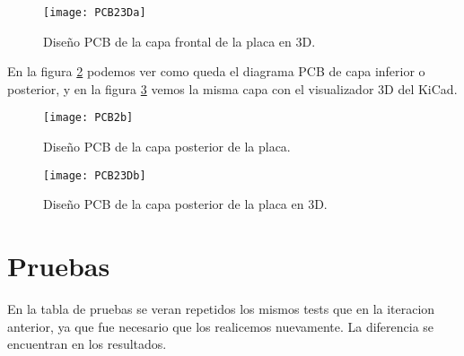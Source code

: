 \begin{figure}	
\centering
  \texttt{[image: PCB23Da]}
  \caption{Diseño PCB de la capa frontal de la placa en 3D.}\label{fig:PCB23Da}
\end{figure}

En la figura \ref{fig:PCB2b} podemos ver como queda el diagrama PCB de capa inferior o posterior, y en la figura \ref{fig:PCB23Db} vemos la misma capa con el visualizador 3D del KiCad.

\begin{figure}	
\centering
  \texttt{[image: PCB2b]}
  \caption{Diseño PCB de la capa posterior de la placa.}\label{fig:PCB2b}
\end{figure}

\begin{figure}	
\centering
  \texttt{[image: PCB23Db]}
  \caption{Diseño PCB de la capa posterior de la placa en 3D.}\label{fig:PCB23Db}
\end{figure}



\section{Pruebas} %
\label{sec:pruebas}

En la tabla de pruebas se veran repetidos los mismos tests que en la iteracion anterior, ya que fue necesario que los realicemos nuevamente. La diferencia se encuentran en los resultados.

